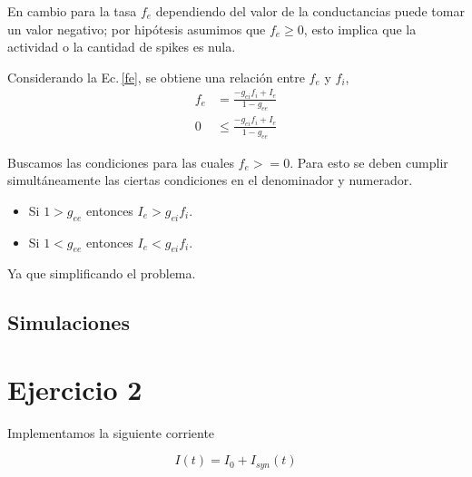 En cambio para la tasa $f_e$ dependiendo del valor de la conductancias puede tomar un valor negativo; por hipótesis asumimos que $f_e \ge 0$, esto implica que la actividad o la cantidad de spikes es nula.

Considerando la Ec.\,\ref{fe}, se obtiene una relación entre $f_e$ y $f_i$,
\begin{align}
	     f_e &=\frac{-g_{ei}f_i + I_e}{1 -g_{ee}}\\
	     0 &\le \frac{-g_{ei}f_i + I_e}{1 -g_{ee}}
\end{align}

Buscamos las condiciones para las cuales $f_e>=0$. Para esto se deben cumplir simultáneamente las ciertas condiciones en el denominador y numerador.

\begin{itemize}
	\item Si $1 > g_{ee}$ entonces  $I_e > g_{ei}f_i$.
	\item Si $1 < g_{ee}$ entonces  $I_e < g_{ei}f_i$.
\end{itemize}

Ya que simplificando el problema.
\subsection{Simulaciones}



\section{Ejercicio 2}


Implementamos la siguiente corriente

\begin{equation}
	I(t) = I_0 + I_{syn}(t)
\end{equation}



